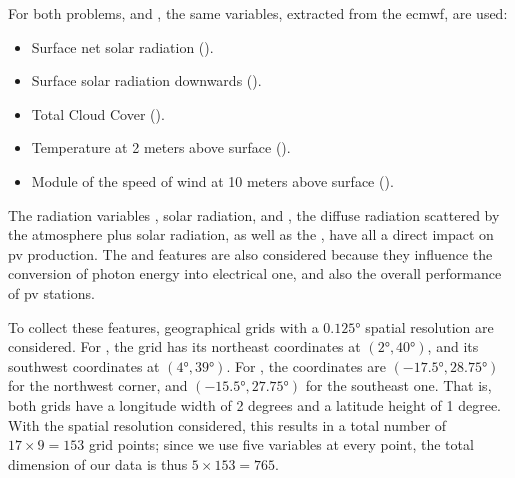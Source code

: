 For both problems,  and , the same variables, extracted from the \acrshort{ecmwf}, are used:
\begin{itemize}
    \item Surface net solar {radiation} ().
    \item Surface solar radiation {downwards} ().
    \item {Total Cloud Cover} %
     ().
    \item Temperature at 2 {meters} above surface ().
    \item Module of the speed of wind at {10 meters} above surface ().
\end{itemize}
The radiation variables , solar radiation, and , the diffuse radiation scattered by the atmosphere plus solar radiation, as well as the , have all a direct impact on \acrshort{pv} production.
%
The  and  features are also considered because they influence the conversion of photon energy into electrical one, and also the overall performance of \acrshort{pv} stations.
%

To collect these features, geographical grids with a $\ang{0.125}$ spatial resolution are considered. For , the grid has its northeast coordinates at $(\ang{2}, \ang{40})$, and its southwest coordinates at $(\ang{4}, \ang{39})$. For , the coordinates are $(\ang{-17.5}, \ang{28.75})$ for the northwest corner, and $(\ang{-15.5}, \ang{27.75})$ for the southeast one.
%
That is, both grids have a longitude width of 2 degrees and a latitude height of 1 degree. With the spatial resolution considered, this results in a total number of $17 \times 9 = 153$ grid points; since we use five variables at every point, the total dimension of our data is thus $5 \times 153 = 765$. 


